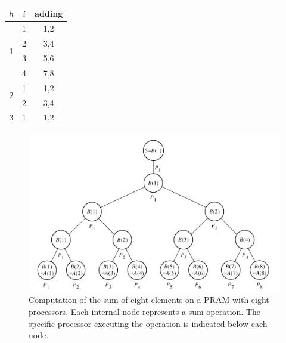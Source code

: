 \begin{table}[!htp]
    \centering
    \begin{tabular}{@{} c c c @{}}
        \toprule
        $h$ & $i$ & adding \\
        \midrule
        \multirow{4}{*}{1} & 1 & 1,2 \\
          & 2 & 3,4 \\
          & 3 & 5,6 \\
          & 4 & 7,8 \\
        \cmidrule{1-3}
        \multirow{2}{*}{2} & 1 & 1,2 \\
          & 2 & 3,4 \\
        \cmidrule{1-3}
        3 & 1 & 1,2 \\
        \bottomrule
    \end{tabular}
\end{table}

\newpage

\begin{figure}[!htp]
    \centering
    \includegraphics[width=\textwidth]{img/SPDM-sum-1.jpg}
    \caption{Computation of the sum of eight elements on a PRAM with eight processors. Each internal node represents a sum operation. The specific processor executing the operation is indicated below each node.}
    \label{fig: SPDM-sum-1}
\end{figure}

